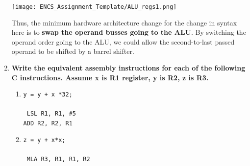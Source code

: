 \documentclass{article}
\begin{document}
\begin{enumerate}
	\begin{center}
	    \texttt{[image: ENCS\_Assignment\_Template/ALU\_regs1.png]}
	\end{center} 

	Thus, the minimum hardware architecture change for the change in syntax here is to \textbf{swap the operand busses going to the ALU}. By switching the operand order going to the ALU, we could allow the second-to-last passed operand to be shifted by a barrel shifter.
	\\
	\newpage
	\item \textbf{Write the equivalent assembly instructions for each of the following C instructions. Assume x is R1 register, y is R2, z is R3.}
    \\
    \begin{enumerate}
        \item  \texttt{y = y + x *32;} 
        \\ \\
        \texttt{
            LSL R1, R1, \#5 \\ 
            ADD R2, R2, R1
        }
        
        \item \texttt{z = y + x*x;}
        \\ \\
        \texttt{
            MLA R3, R1, R1, R2 \\
        }
    \end{enumerate}
	


\end{enumerate}
\end{document}
